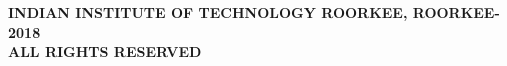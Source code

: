 \thispagestyle{empty}
\vspace*{80mm}
{
 \begin{center}
 \bfseries{}\selectfont \textcopyright INDIAN INSTITUTE OF TECHNOLOGY ROORKEE, ROORKEE-2018\\\vspace{-01ex}ALL RIGHTS RESERVED 
 \end{center}
}
